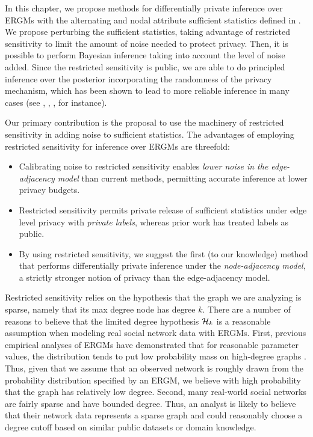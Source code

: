 In this chapter, we propose methods for differentially private inference over ERGMs with the alternating and nodal attribute sufficient statistics defined in . We propose perturbing the sufficient statistics, taking advantage of restricted sensitivity to limit the amount of noise needed to protect privacy. Then, it is possible to perform Bayesian inference taking into account the level of noise added. Since the restricted sensitivity is public, we are able to do principled inference over the posterior incorporating the randomness of the privacy mechanism, which has been shown to lead to more reliable inference in many cases (see \cite{FGWC16}, \cite{KS16}, \cite{KKS17}, \cite{LM14} for instance). 

Our primary contribution is the proposal to use the machinery of restricted sensitivity in adding noise to sufficient statistics. The advantages of employing restricted sensitivity for inference over ERGMs are threefold:

\begin{itemize}
	\item Calibrating noise to restricted sensitivity enables \emph{lower noise in the edge-adjacency model} than current methods, permitting accurate inference at lower privacy budgets.
	\item Restricted sensitivity permits private release of sufficient statistics under edge level privacy with \emph{private labels}, whereas prior work has treated labels as public.
	\item By using restricted sensitivity, we suggest the first (to our knowledge) method that performs differentially private inference under the \emph{node-adjacency model}, a strictly stronger notion of privacy than the edge-adjacency model.
\end{itemize} 

Restricted sensitivity relies on the hypothesis that the graph we are analyzing is sparse, namely that its max degree node has degree $k$.  There are a number of reasons to believe that the limited degree hypothesis $\mathcal{H}_k$ is a reasonable assumption when modeling real social network data with ERGMs. First, previous empirical analyses of ERGMs have demonstrated that for reasonable parameter values, the distribution tends to put low probability mass on high-degree graphs \cite{Sni+06}. Thus, given that we assume that an observed network is roughly drawn from the probability distribution specified by an ERGM, we believe with high probability that the graph has relatively low degree. Second, many real-world social networks are fairly sparse and have bounded degree. Thus, an analyst is likely to believe that their network data represents a sparse graph and could reasonably choose a degree cutoff based on similar public datasets or domain knowledge.  

